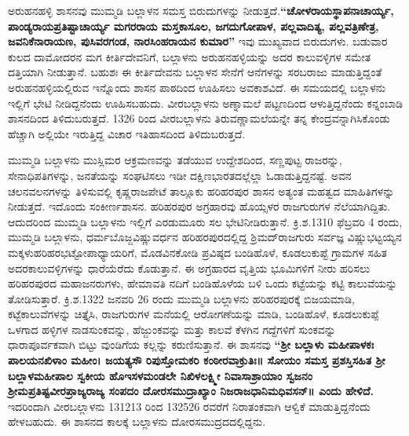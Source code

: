 ಅರುಹನಹಳ್ಳಿ ಶಾಸನವು ಮುಮ್ಮಡಿ ಬಲ್ಲಾಳನ ಸಮಸ್ತ ಬಿರುದುಗಳನ್ನು ನೀಡುತ್ತದೆ.\textbf{“ಚೋಳರಾಯಸ್ಥಾಪನಾಚಾರ್ಯ್ಯ, ಪಾಂಡ್ಯರಾಯಪ್ರತಿಷ್ಟಾಚಾರ್ಯ್ಯ ಮಗರರಾಯ ಮಸ್ತಕಾಸೂಲ, ಜಗದುಗೋಪಾಳ, ಪಲ್ಲವಾದಿತ್ಯ, ಪಲ್ಲವತ್ರಿಣೇತ್ರ,\general{\break } ಜವನಿಕೆನಾರಾಯಣ, ಪುಸಿವರಗಂಡ, ನಾರಸಿಂಹರಾಯನ ಕುಮಾರ”} ಇವು ಮುಖ್ಯವಾದ ಬಿರುದುಗಳು. ಬಡುವಾರ ಕುಲದ ದಾಮೋದರನ ಮಗ ಕೀರ್ತಿದೇವನಿಗೆ, ಬಲ್ಲಾಳನು ಅರುಹನಹಳ್ಳಿಯನ್ನು ಅದರ ಕಾಲುವಳ್ಳಿಗಳ ಸಮೇತ ದತ್ತಿಯಾಗಿ ನೀಡುತ್ತಾನೆ. ಬಹುಶಃ ಈ ಕೀರ್ತಿದೇವನು ಬಲ್ಲಾಳನ ಸೇನೆಗೆ ಆನೆಗಳನ್ನು ಸರಬರಾಜು ಮಾಡುತ್ತಿದ್ದಂತೆ ಅರುಹನಹಳ್ಳಿಯಲ್ಲಿರುವ ಇನ್ನೊಂದು ಶಾಸನ ಪಾಠದಿಂದ ಊಹಿಸಲು ಅವಕಾಶವಿದೆ. ಈ ಸಮಯದಲ್ಲಿ ಬಲ್ಲಾಳನು ಇಲ್ಲಿಗೆ ಭೇಟಿ ನೀಡಿದ್ದನೆಂದು ಊಹಿಸಬಹುದು. ವೀರಬಲ್ಲಾಳನು ಅಣ್ನಾಮಲೆ ಪಟ್ಟಣದಿಂದ ಆಳುತ್ತಿದ್ದನೆಂದು ಕನ್ನಂಬಾಡಿ ಶಾಸನದಿಂದ ತಿಳಿದುಬರುತ್ತದೆ. 1326 ರಿಂದ ವೀರಬಲ್ಲಾಳನು ತಿರುವಣ್ಣಾಮಲೆಯನ್ನೇ ತನ್ನ ಕೇಂದ್ರವನ್ನಾಗಿಸಿಕೊಂಡು ಹೆಚ್ಚಾಗಿ ಅಲ್ಲಿಯೇ ಇರುತ್ತಿದ್ದ ವಿಚಾರ ಇತಿಹಾಸದಿಂದ ತಿಳಿದುಬರುತ್ತದೆ.

ಮುಮ್ಮಡಿ ಬಲ್ಲಾಳನು ಮುಸ್ಲಿಮರ ಆಕ್ರಮಣವನ್ನು ತಡೆಯುವ ಉದ್ದೇಶದಿಂದ, ಸಣ್ಣಪುಟ್ಟ ರಾಜರನ್ನು, ಸೇನಾಧಿಪತಿಗಳನ್ನು, ಜನತೆಯನ್ನು ಸಂಘಟಿಸಲು ಇಡೀ ದಕ್ಷಿಣಭಾರತದಲ್ಲೆಲ್ಲಾ ಓಡಾಡುತ್ತಿದ್ದನಷ್ಟೆ. ಅವನ ಚಲನವಲನಗಳನ್ನು ತಿಳಿಸುವಲ್ಲಿ ಕೃಷ್ಣರಾಜಪೇಟೆ ತಾಲ್ಲೂಕು ಹರಿಹರಪುರ ಶಾಸನ ಅತ್ಯಂತ ಮಹತ್ವದ ಮಾಹಿತಿಗಳನ್ನು ನೀಡುತ್ತದೆ. ಇದೊಂದು ಸಂಕೀರ್ಣ\-ಶಾಸನ. ಹರಿಹರಪುರ ಅಗ್ರಹಾರವು ಹೊಯ್ಸಳರ ರಾಜಗುರುಗಳ ನೆಲೆಯಾಗಿದ್ದಿತು. ಆದುದರಿಂದ ಮುಮ್ಮಡಿ ಬಲ್ಲಾಳನು ಇಲ್ಲಿಗೆ ಎರಡುಮೂರು ಸಲ ಭೇಟಿನೀಡಿರುತ್ತಾನೆ. ಕ್ರಿ.ಶ.1310 ಫೆಬ್ರವರಿ 4 ರಂದು, ಮುಮ್ಮಡಿ ಬಲ್ಲಾಳನು, ಧರ್ಮಬೊಜ್ಜವಿಷ್ಣುವರ್ಧನ ಹರಿಹರಪುರದಲ್ಲಿದ್ದ ಶ್ರಿಮದ್​ರಾಜಗುರು ಸರ್ವಜ್ಞ ವಿಷ್ಣುಭಟ್ಟಯ್ಯನ ಮಕ್ಕಳು\break ಹರಿಹರಭಟ್ಟೋಪಾಧ್ಯಾಯರಿಗೆ, ಮೊಡವಿನಕೋಡಿ ಪ್ರವಿಷ್ಠದ ಬಂಡಿಹೊಳೆ, ಕೂಡಲುಕುಪ್ಟೆ ಗ್ರಾಮಗಳ ಸಹಿತ ಅದರ\break ಕಾಲುವಳ್ಳಿಗಳನ್ನು ಧಾರೆಯೆರೆದು ಕೊಡುತ್ತಾನೆ. ಈ ಅಗ್ರಹಾರದ ವೃತ್ತಿಯ ಭೂಮಿಗಳಿಗೆ ನೀರು ಹರಿಸಲು ಹರಿಹರಪುರದ ಮಹಾಜನರುಗಳು, ಹೇಮಾವತಿ ನದಿಗೆ ಬಂಡಿಹೊಳೆಯ ಬಳಿ ಒಂದು ಕಟ್ಟೆಯನ್ನು ಕಟ್ಟಿ ಕಾಲುವೆಯನ್ನು ತೋಡಿಸುತ್ತಾರೆ. ಕ್ರಿ.ಶ.1322 ಜನವರಿ 26 ರಂದು ಮುಮ್ಮಡಿ ಬಲ್ಲಾಳನು ಹರಿಹರಪುರಕ್ಕೆ ಬಿಜಯಮಾಡಿ, ಕಟ್ಟೆಕಾಲುವೆಗಳನ್ನು ಚಿತ್ತೈಸಿ, ರಾಜಗುರುಗಳ ಮನೆಯಲ್ಲಿ ಆರೋಗಣೆಯನ್ನು ಮಾಡಿ, ಬಂಡಿಹೊಳೆ, ಕೂಡಲುಕುಪ್ಪೆ ಒಳಗಾದ ಹಳ್ಳಿಗಳ ನಾಡಸುಂಕವನ್ನು, ಹೆಜ್ಜುಂಕವನ್ನು ಮತ್ತು ಕಾಲವೆ ಕೆಳಗಿನ ಗದ್ದೆಗಳಿಗೆ ಸುಂಕವನ್ನು ಧಾರಾಪೂರ್ವಕವಾಗಿ ಬಿಟ್ಟು ವುಂಡಿಗೆಯ ಕಲ್ಲನ್ನು ಕರುಣಿಸು\-ತ್ತಾನೆ. ಈ ಶಾಸನವು \textbf{“ಶ‍್ರೀ ಬಲ್ಲಾಳು ಮಹೀಪಾಳಕಃ ಪಾಲಯನಖಿಳಾಂ ಮಹೀಂ। ಜಯತ್ಯಸೌ ರಿಪುಸ್ತೋಮಕರಿ ಕಂಠೀರವಾಕ್ರುತಿಃ॥ ಸೋಯಂ ಸಮಸ್ತ ಪ್ರಶಸ್ತಿಸಹಿತ ಶ‍್ರೀ ಬಲ್ಲಾಳಮಹೀಪಾಲ ಸ್ವಕೀಯ ಹೊಇಸಳಮಂಡಲೇ ನಿಖಿಳಲಕ್ಷ್ಮೀ ನಿವಾಸಾಶ್ರಾಯಾಂ ಸ್ವಜನಂ ಶ‍್ರೀಮಪ್ರತಿಷ್ಟವೀರಪ್ರಾಜ್ಯರಾಜ್ಯ ಸಂಪದಂ ದೋರಸಮುದ್ರಾಖ್ಯಾಂ ನಿಜರಾಜಧಾನಿಮಧಿವಸನ್​॥ ಎಂದು ಹೇಳಿದೆ. } ಇದರಿಂದಾಗಿ ವೀರಬಲ್ಲಾಳನು 131213 ರಿಂದ 132526 ರವರೆಗೆ ನಿರಾತಂಕವಾಗಿ ಆಳ್ವಿಕೆ ಮಾಡುತ್ತಿದ್ದನೆಂದು ಹೇಳಬಹುದು. ಈ ಶಾಸನದ ಕಾಲಕ್ಕೆ ಬಲ್ಲಾಳನು ದೋರಸಮುದ್ರದದಲ್ಲಿದ್ದನು. 

